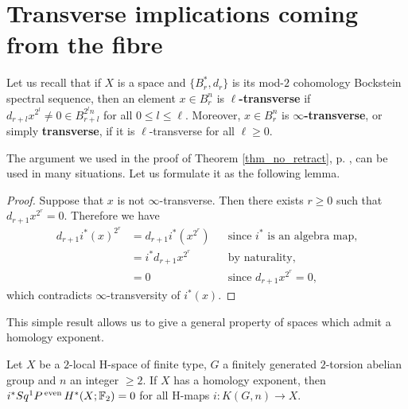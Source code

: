 \section{Transverse implications coming from the fibre}

Let us recall that if $X$ is a space and $\{B^*_r,d_r\}$ is its mod-$2$ cohomology Bockstein spectral sequence, then an element $x\in B^n_r$ is {\bf $\ell$-transverse} if $d_{r+l}x^{2^l}\not=0\in B^{2^l n}_{r+l}$ for all $0\leq l\leq\ell$. Moreover, $x\in B^n_r$ is {\bf $\infty$-transverse}, or simply {\bf transverse}, if it is $\ell$-transverse for all $\ell\geq0$.

\medskip
The argument we used in the proof of Theorem \ref{thm_no_retract}, p. \pageref{arg:no_retract},  can be used in many situations. Let us formulate it as the following lemma.

\begin{lem_transverse_fibre}

\end{lem_transverse_fibre}

\begin{proof} %
\label{l:transversity from the fibre:proof}
Suppose that $x$ is not $\infty$-transverse. Then there exists $r\geq0$ such that $d_{r+1}x^{2^r}=0$. Therefore we have
\begin{align*}
d_{r+1}i^*(x)^{2^r} &=d_{r+1}i^*(x^{2^r}) &&\text{since $i^*$ is an algebra map,}\\
&=i^*d_{r+1}x^{2^r} &&\text{by naturality,}\\
&=0 &&\text{since $d_{r+1}x^{2^r}=0$},
\end{align*} which contradicts $\infty$-transversity of $i^*(x)$.
\end{proof}

This simple result allows us to give a general property of spaces which admit a homology exponent.

\begin{thm}\label{t:caract_cohomol}
Let $X$ be a $2$-local H-space of finite type, $G$ a finitely generated $2$-torsion abelian group and $n$ an integer $\geq2$. If $X$ has a homology exponent, then $i^*Sq^1P\operatorname{^{even}} H^*(X;\mathbb{F}_2)=0$ for all H-maps $i:K(G,n)\to X$.
\end{thm}

